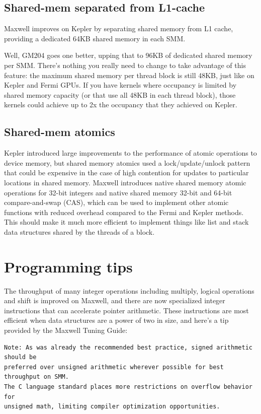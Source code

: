 \subsection{Shared-mem separated from L1-cache}

Maxwell improves on Kepler by separating shared memory from L1 cache, providing
a dedicated 64KB shared memory in each SMM. 

Well, GM204 goes one better, upping that to 96KB of dedicated shared memory per
SMM. There's nothing you really need to change to take advantage of this
feature: the maximum shared memory per thread block is still 48KB, just like on
Kepler and Fermi GPUs. If you have kernels where occupancy is limited by shared
memory capacity (or that use all 48KB in each thread block), those kernels could
achieve up to 2x the occupancy that they achieved on Kepler.

\subsection{Shared-mem atomics}

Kepler introduced large improvements to the performance of atomic operations to
device memory, but shared memory atomics used a lock/update/unlock pattern that
could be expensive in the case of high contention for updates to particular
locations in shared memory. Maxwell introduces native shared memory atomic
operations for 32-bit integers and native shared memory 32-bit and 64-bit
compare-and-swap (CAS), which can be used to implement other atomic functions
with reduced overhead compared to the Fermi and Kepler methods. This should make
it much more efficient to implement things like list and stack data structures
shared by the threads of a block.



\section{Programming tips}

The throughput of many integer operations including multiply, logical operations
and shift is improved on Maxwell, and there are now specialized integer
instructions that can accelerate pointer arithmetic. These instructions are most
efficient when data structures are a power of two in size, and here's a tip
provided by the Maxwell Tuning Guide:   

\begin{verbatim}
Note: As was already the recommended best practice, signed arithmetic should be
preferred over unsigned arithmetic wherever possible for best throughput on SMM.
The C language standard places more restrictions on overflow behavior for
unsigned math, limiting compiler optimization opportunities.  
\end{verbatim}


